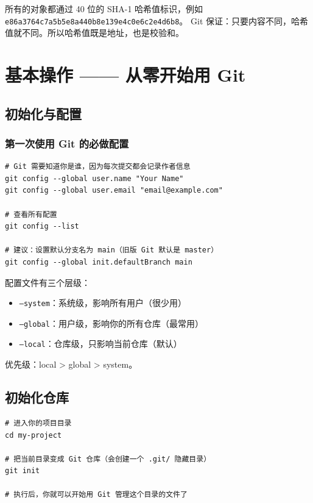\documentclass[12pt,a4paper]{article}
\begin{document}
所有的对象都通过 40 位的 SHA-1 哈希值标识，例如 \texttt{e86a3764c7a5b5e8a440b8e139e4c0e6c2e4d6b8}。
Git 保证：只要内容不同，哈希值就不同。所以哈希值既是地址，也是校验和。

\section{基本操作 —— 从零开始用 Git}

\subsection{初始化与配置}

\subsubsection{第一次使用 Git 的必做配置}

\begin{lstlisting}
# Git 需要知道你是谁，因为每次提交都会记录作者信息
git config --global user.name "Your Name"
git config --global user.email "email@example.com"

# 查看所有配置
git config --list

# 建议：设置默认分支名为 main（旧版 Git 默认是 master）
git config --global init.defaultBranch main
\end{lstlisting}

配置文件有三个层级：
\begin{itemize}[itemsep=3pt]
    \item \texttt{--system}：系统级，影响所有用户（很少用）
    \item \texttt{--global}：用户级，影响你的所有仓库（最常用）
    \item \texttt{--local}：仓库级，只影响当前仓库（默认）
\end{itemize}
优先级：local > global > system。

\subsection{初始化仓库}

\begin{lstlisting}
# 进入你的项目目录
cd my-project

# 把当前目录变成 Git 仓库（会创建一个 .git/ 隐藏目录）
git init

# 执行后，你就可以开始用 Git 管理这个目录的文件了
\end{lstlisting}
\end{document}
